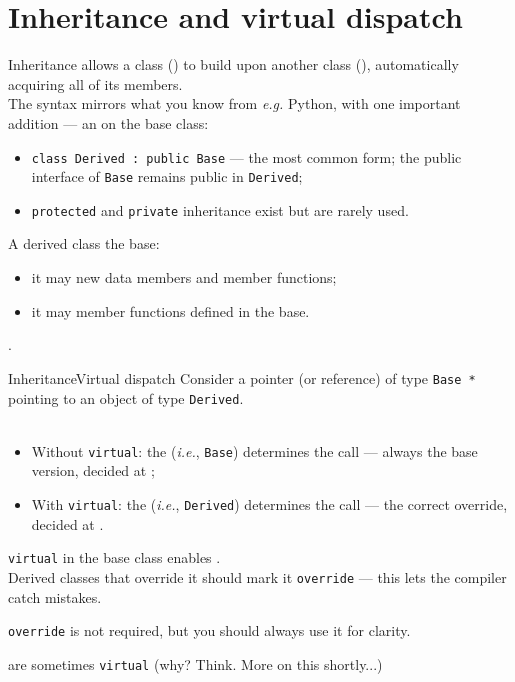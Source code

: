 
\section{Inheritance and virtual dispatch}
\graphicspath{{figs/section4/}}

\begin{frame}{Inheritance}
	\justifying
	 allows a class () to build upon another class (), automatically acquiring all of its members.\\
	\bigskip
	The syntax mirrors what you know from \emph{e.g.} Python, with one important addition — an  on the base class:
	\begin{itemize}
		\item \texttt{class Derived~:~public Base} — the most common form; the public interface of \texttt{Base} remains public in \texttt{Derived};
		\item \texttt{protected} and \texttt{private} inheritance exist but are rarely used.
	\end{itemize}
	\bigskip
	A derived class  the base:
	\begin{itemize}
		\item it may  new data members and member functions;
		\item it may  member functions defined in the base.
	\end{itemize}
	.
\end{frame}
\begin{frame}{Inheritance}{Virtual dispatch}
	\justifying
	Consider a pointer (or reference) of type \texttt{Base *} pointing to an object of type \texttt{Derived}.\\
	\\
	\bigskip
	\begin{itemize}
		\item Without \texttt{virtual}: the  (\emph{i.e.}, \texttt{Base}) determines the call — always the base version, decided at ;
		\item With \texttt{virtual}: the  (\emph{i.e.}, \texttt{Derived}) determines the call — the correct override, decided at .
	\end{itemize}
	\bigskip
	 \texttt{virtual} in the base class enables .\\
	Derived classes that override it should mark it \texttt{override} — this lets the compiler catch mistakes.
	\begin{block}{}
		\centering
		\texttt{override} is not required, but you should always use it for clarity.
	\end{block}
   are sometimes \texttt{virtual} (why? Think. More on this shortly...)
\end{frame}
